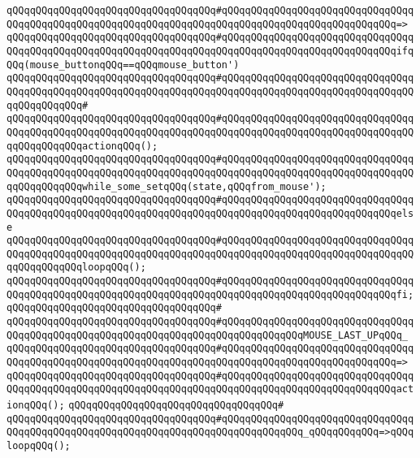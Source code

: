 \verb|qQQqqQQqqQQqqQQqqQQqqQQqqQQqqQQqqQQq#qQQqqQQqqQQqqQQqqQQqqQQqqQQqqQQqqQQqqQQqqQQqqQQqqQQqqQQqqQQqqQQqqQQqqQQqqQQqqQQqqQQqqQQqqQQqqQQqqQQq=>|\newline
\verb|qQQqqQQqqQQqqQQqqQQqqQQqqQQqqQQqqQQq#qQQqqQQqqQQqqQQqqQQqqQQqqQQqqQQqqQQqqQQqqQQqqQQqqQQqqQQqqQQqqQQqqQQqqQQqqQQqqQQqqQQqqQQqqQQqqQQqqQQqifqQQq(mouse_buttonqQQq==qQQqmouse_button')|\newline
\verb|qQQqqQQqqQQqqQQqqQQqqQQqqQQqqQQqqQQq#qQQqqQQqqQQqqQQqqQQqqQQqqQQqqQQqqQQqqQQqqQQqqQQqqQQqqQQqqQQqqQQqqQQqqQQqqQQqqQQqqQQqqQQqqQQqqQQqqQQqqQQqqQQqqQQqqQQq#|\newline
\verb|qQQqqQQqqQQqqQQqqQQqqQQqqQQqqQQqqQQq#qQQqqQQqqQQqqQQqqQQqqQQqqQQqqQQqqQQqqQQqqQQqqQQqqQQqqQQqqQQqqQQqqQQqqQQqqQQqqQQqqQQqqQQqqQQqqQQqqQQqqQQqqQQqqQQqqQQqactionqQQq();|\newline
\verb|qQQqqQQqqQQqqQQqqQQqqQQqqQQqqQQqqQQq#qQQqqQQqqQQqqQQqqQQqqQQqqQQqqQQqqQQqqQQqqQQqqQQqqQQqqQQqqQQqqQQqqQQqqQQqqQQqqQQqqQQqqQQqqQQqqQQqqQQqqQQqqQQqqQQqqQQqwhile_some_setqQQq(state,qQQqfrom_mouse');|\newline
\verb|qQQqqQQqqQQqqQQqqQQqqQQqqQQqqQQqqQQq#qQQqqQQqqQQqqQQqqQQqqQQqqQQqqQQqqQQqqQQqqQQqqQQqqQQqqQQqqQQqqQQqqQQqqQQqqQQqqQQqqQQqqQQqqQQqqQQqqQQqelse|\newline
\verb|qQQqqQQqqQQqqQQqqQQqqQQqqQQqqQQqqQQq#qQQqqQQqqQQqqQQqqQQqqQQqqQQqqQQqqQQqqQQqqQQqqQQqqQQqqQQqqQQqqQQqqQQqqQQqqQQqqQQqqQQqqQQqqQQqqQQqqQQqqQQqqQQqqQQqqQQqloopqQQq();|\newline
\verb|qQQqqQQqqQQqqQQqqQQqqQQqqQQqqQQqqQQq#qQQqqQQqqQQqqQQqqQQqqQQqqQQqqQQqqQQqqQQqqQQqqQQqqQQqqQQqqQQqqQQqqQQqqQQqqQQqqQQqqQQqqQQqqQQqqQQqqQQqfi;|\newline
\verb|qQQqqQQqqQQqqQQqqQQqqQQqqQQqqQQqqQQq#|\newline
\verb|qQQqqQQqqQQqqQQqqQQqqQQqqQQqqQQqqQQq#qQQqqQQqqQQqqQQqqQQqqQQqqQQqqQQqqQQqqQQqqQQqqQQqqQQqqQQqqQQqqQQqqQQqqQQqqQQqqQQqqQQqMOUSE_LAST_UPqQQq_|\newline
\verb|qQQqqQQqqQQqqQQqqQQqqQQqqQQqqQQqqQQq#qQQqqQQqqQQqqQQqqQQqqQQqqQQqqQQqqQQqqQQqqQQqqQQqqQQqqQQqqQQqqQQqqQQqqQQqqQQqqQQqqQQqqQQqqQQqqQQqqQQq=>|\newline
\verb|qQQqqQQqqQQqqQQqqQQqqQQqqQQqqQQqqQQq#qQQqqQQqqQQqqQQqqQQqqQQqqQQqqQQqqQQqqQQqqQQqqQQqqQQqqQQqqQQqqQQqqQQqqQQqqQQqqQQqqQQqqQQqqQQqqQQqqQQqactionqQQq();|\newline
\verb|qQQqqQQqqQQqqQQqqQQqqQQqqQQqqQQqqQQq#|\newline
\verb|qQQqqQQqqQQqqQQqqQQqqQQqqQQqqQQqqQQq#qQQqqQQqqQQqqQQqqQQqqQQqqQQqqQQqqQQqqQQqqQQqqQQqqQQqqQQqqQQqqQQqqQQqqQQqqQQqqQQqqQQq_qQQqqQQqqQQq=>qQQqloopqQQq();|\newline
